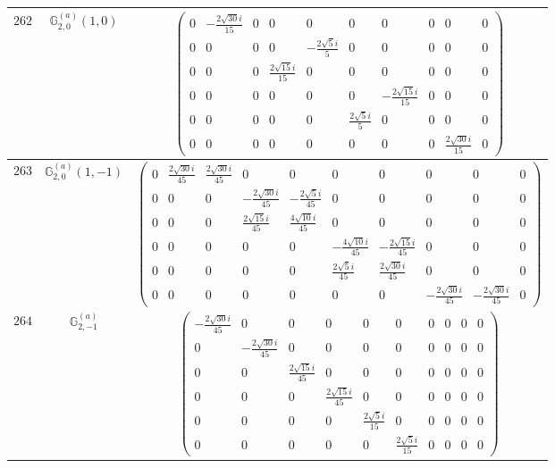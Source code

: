 \documentclass[fleqn,8pt,landscape]{jsarticle}
\begin{document}
\begin{center}
\begin{longtable}{ccc}
$ 262 $ & $ \mathbb{G}_{2,0}^{(a)}(1,0) $ & $ \begin{pmatrix} 0 & - \frac{2 \sqrt{30} i}{15} & 0 & 0 & 0 & 0 & 0 & 0 & 0 & 0 \\ 0 & 0 & 0 & 0 & - \frac{2 \sqrt{5} i}{5} & 0 & 0 & 0 & 0 & 0 \\ 0 & 0 & 0 & \frac{2 \sqrt{15} i}{15} & 0 & 0 & 0 & 0 & 0 & 0 \\ 0 & 0 & 0 & 0 & 0 & 0 & - \frac{2 \sqrt{15} i}{15} & 0 & 0 & 0 \\ 0 & 0 & 0 & 0 & 0 & \frac{2 \sqrt{5} i}{5} & 0 & 0 & 0 & 0 \\ 0 & 0 & 0 & 0 & 0 & 0 & 0 & 0 & \frac{2 \sqrt{30} i}{15} & 0 \end{pmatrix} $ \\ \hline
$ 263 $ & $ \mathbb{G}_{2,0}^{(a)}(1,-1) $ & $ \begin{pmatrix} 0 & \frac{2 \sqrt{30} i}{45} & \frac{2 \sqrt{30} i}{45} & 0 & 0 & 0 & 0 & 0 & 0 & 0 \\ 0 & 0 & 0 & - \frac{2 \sqrt{30} i}{45} & - \frac{2 \sqrt{5} i}{45} & 0 & 0 & 0 & 0 & 0 \\ 0 & 0 & 0 & \frac{2 \sqrt{15} i}{45} & \frac{4 \sqrt{10} i}{45} & 0 & 0 & 0 & 0 & 0 \\ 0 & 0 & 0 & 0 & 0 & - \frac{4 \sqrt{10} i}{45} & - \frac{2 \sqrt{15} i}{45} & 0 & 0 & 0 \\ 0 & 0 & 0 & 0 & 0 & \frac{2 \sqrt{5} i}{45} & \frac{2 \sqrt{30} i}{45} & 0 & 0 & 0 \\ 0 & 0 & 0 & 0 & 0 & 0 & 0 & - \frac{2 \sqrt{30} i}{45} & - \frac{2 \sqrt{30} i}{45} & 0 \end{pmatrix} $ \\ \hline
$ 264 $ & $ \mathbb{G}_{2,-1}^{(a)} $ & $ \begin{pmatrix} - \frac{2 \sqrt{30} i}{45} & 0 & 0 & 0 & 0 & 0 & 0 & 0 & 0 & 0 \\ 0 & - \frac{2 \sqrt{30} i}{45} & 0 & 0 & 0 & 0 & 0 & 0 & 0 & 0 \\ 0 & 0 & \frac{2 \sqrt{15} i}{45} & 0 & 0 & 0 & 0 & 0 & 0 & 0 \\ 0 & 0 & 0 & \frac{2 \sqrt{15} i}{45} & 0 & 0 & 0 & 0 & 0 & 0 \\ 0 & 0 & 0 & 0 & \frac{2 \sqrt{5} i}{15} & 0 & 0 & 0 & 0 & 0 \\ 0 & 0 & 0 & 0 & 0 & \frac{2 \sqrt{5} i}{15} & 0 & 0 & 0 & 0 \end{pmatrix} $ \\ \hline

\end{longtable}
\end{center}
\end{document}
